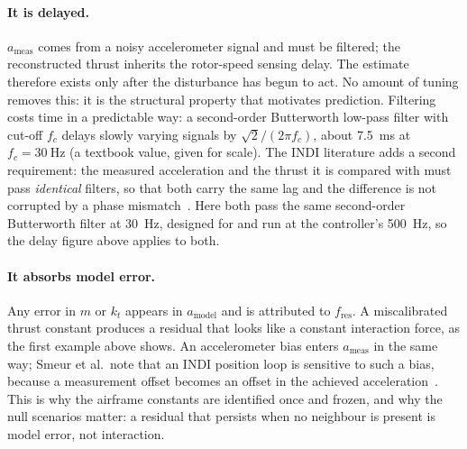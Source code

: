 \paragraph{It is delayed.} $a_{\mathrm{meas}}$ comes from a noisy accelerometer signal
and must be filtered; the reconstructed thrust inherits the rotor-speed sensing delay. The estimate
therefore exists only after the disturbance has begun to act. No amount of tuning removes this: it
is the structural property that motivates prediction. Filtering costs time in a predictable way: a
second-order Butterworth low-pass filter with cut-off $f_c$ delays slowly varying signals by
$\sqrt{2}/(2\pi f_c)$, about \SI{7.5}{\milli\second} at $f_c = \SI{30}{\hertz}$ (a textbook value,
given for scale). The INDI literature adds a second requirement: the measured acceleration and the
thrust it is compared with must pass \emph{identical} filters, so that both carry the same lag and
the difference is not corrupted by a phase mismatch~\cite{tal2018indi,smeur2017cascadedindi}. Here
both pass the same second-order Butterworth filter at \SI{30}{\hertz}, designed for and run at the
controller's \SI{500}{\hertz}, so the delay figure above applies to both.

\paragraph{It absorbs model error.} Any error in $m$ or $k_t$ appears in $a_{\mathrm{model}}$ and is
attributed to $f_{\mathrm{res}}$. A miscalibrated thrust constant produces a residual that looks
like a constant interaction force, as the first example above shows.
An accelerometer bias enters $a_{\mathrm{meas}}$ in the same way; Smeur et al.\ note that an INDI
position loop is sensitive to such a bias, because a measurement offset becomes an offset in the
achieved acceleration~\cite{smeur2017cascadedindi}.
This is why the airframe constants are identified once and
frozen, and why the null scenarios matter: a residual that persists when no neighbour is present is
model error, not interaction.

